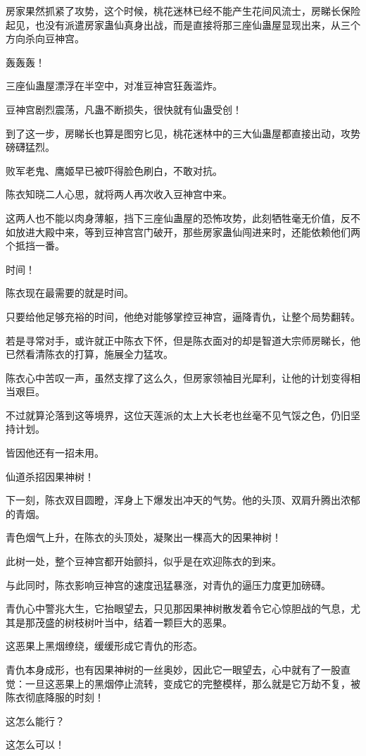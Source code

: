 \begin{this_body}
房家果然抓紧了攻势，这个时候，桃花迷林已经不能产生花间风流士，房睇长保险起见，也没有派遣房家蛊仙真身出战，而是直接将那三座仙蛊屋显现出来，从三个方向杀向豆神宫。

轰轰轰！

三座仙蛊屋漂浮在半空中，对准豆神宫狂轰滥炸。

豆神宫剧烈震荡，凡蛊不断损失，很快就有仙蛊受创！

到了这一步，房睇长也算是图穷匕见，桃花迷林中的三大仙蛊屋都直接出动，攻势磅礴猛烈。

败军老鬼、鹰姬早已被吓得脸色刷白，不敢对抗。

陈衣知晓二人心思，就将两人再次收入豆神宫中来。

这两人也不能以肉身薄躯，挡下三座仙蛊屋的恐怖攻势，此刻牺牲毫无价值，反不如放进大殿中来，等到豆神宫宫门破开，那些房家蛊仙闯进来时，还能依赖他们两个抵挡一番。

时间！

陈衣现在最需要的就是时间。

只要给他足够充裕的时间，他绝对能够掌控豆神宫，逼降青仇，让整个局势翻转。

若是寻常对手，或许就正中陈衣下怀，但是陈衣面对的却是智道大宗师房睇长，他已然看清陈衣的打算，施展全力猛攻。

陈衣心中苦叹一声，虽然支撑了这么久，但房家领袖目光犀利，让他的计划变得相当艰巨。

不过就算沦落到这等境界，这位天莲派的太上大长老也丝毫不见气馁之色，仍旧坚持计划。

皆因他还有一招未用。

仙道杀招因果神树！

下一刻，陈衣双目圆瞪，浑身上下爆发出冲天的气势。他的头顶、双肩升腾出浓郁的青烟。

青色烟气上升，在陈衣的头顶处，凝聚出一棵高大的因果神树！

此树一处，整个豆神宫都开始颤抖，似乎是在欢迎陈衣的到来。

与此同时，陈衣影响豆神宫的速度迅猛暴涨，对青仇的逼压力度更加磅礴。

青仇心中警兆大生，它抬眼望去，只见那因果神树散发着令它心惊胆战的气息，尤其是那茂盛的树枝树叶当中，结着一颗巨大的恶果。

这恶果上黑烟缭绕，缓缓形成它青仇的形态。

青仇本身成形，也有因果神树的一丝奥妙，因此它一眼望去，心中就有了一股直觉：一旦这恶果上的黑烟停止流转，变成它的完整模样，那么就是它万劫不复，被陈衣彻底降服的时刻！

这怎么能行？

这怎么可以！


\end{this_body}

